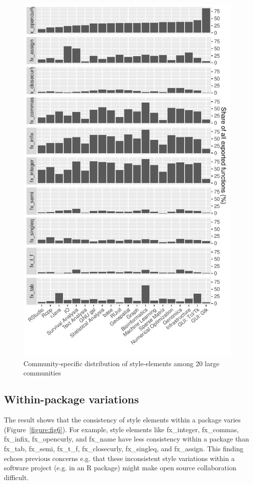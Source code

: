\begin{figure}[htbp]
  \centering
  \includegraphics{fig5}
  \caption{Community-specific distribution of style-elements among 20 large communities}
  \label{figure:fig5}
\end{figure}

\subsection{Within-package variations}

The result shows that the consistency of style elements within a package varies (Figure~\ref{figure:fig6}). For example, style elements like fx\_integer, fx\_commas, fx\_infix, fx\_opencurly, and fx\_name have less consistency within a package than fx\_tab, fx\_semi, fx\_t\_f, fx\_closecurly, fx\_singleq, and fx\_assign. This finding echoes previous concerns e.g. \citet{oman, elish, wang, gillespie2016efficient} that these inconsistent style variations within a software project (e.g. in an R package) might make open source collaboration difficult.

